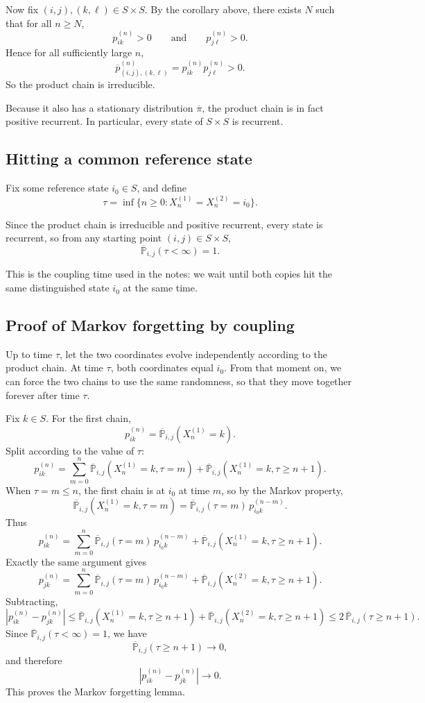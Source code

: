 \documentclass[11pt]{article}
\theoremstyle{definition}
\begin{document}
Now fix \((i,j),(k,\ell)\in S\times S\). By the corollary above, there exists \(N\) such that for all \(n\ge N\),
\[
p_{ik}^{(n)}>0
\qquad\text{and}\qquad
p_{j\ell}^{(n)}>0.
\]
Hence for all sufficiently large \(n\),
\[
\overline p^{(n)}_{(i,j),(k,\ell)}
=
p_{ik}^{(n)}p_{j\ell}^{(n)}
>0.
\]
So the product chain is irreducible.

Because it also has a stationary distribution \(\overline\pi\), the product chain is in fact positive recurrent. In particular, every state of \(S\times S\) is recurrent.

\subsection{Hitting a common reference state}

Fix some reference state \(i_0\in S\), and define
\[
\tau=
\inf\{n\ge 0 : X_n^{(1)}=X_n^{(2)}=i_0\}.
\]

Since the product chain is irreducible and positive recurrent, every state is recurrent, so from any starting point \((i,j)\in S\times S\),
\[
\overline{\mathbb P}_{i,j}(\tau<\infty)=1.
\]

This is the coupling time used in the notes: we wait until both copies hit the same distinguished state \(i_0\) at the same time.

\subsection{Proof of Markov forgetting by coupling}

Up to time \(\tau\), let the two coordinates evolve independently according to the product chain. At time \(\tau\), both coordinates equal \(i_0\). From that moment on, we can force the two chains to use the same randomness, so that they move together forever after time \(\tau\).

Fix \(k\in S\). For the first chain,
\[
p_{ik}^{(n)}
=
\overline{\mathbb P}_{i,j}(X_n^{(1)}=k).
\]
Split according to the value of \(\tau\):
\[
p_{ik}^{(n)}
=
\sum_{m=0}^{n}
\overline{\mathbb P}_{i,j}(X_n^{(1)}=k,\tau=m)
+
\overline{\mathbb P}_{i,j}(X_n^{(1)}=k,\tau\ge n+1).
\]
When \(\tau=m\le n\), the first chain is at \(i_0\) at time \(m\), so by the Markov property,
\[
\overline{\mathbb P}_{i,j}(X_n^{(1)}=k,\tau=m)
=
\overline{\mathbb P}_{i,j}(\tau=m)
\,p_{i_0k}^{(n-m)}.
\]
Thus
\[
p_{ik}^{(n)}
=
\sum_{m=0}^{n}
\overline{\mathbb P}_{i,j}(\tau=m)
\,p_{i_0k}^{(n-m)}
+
\overline{\mathbb P}_{i,j}(X_n^{(1)}=k,\tau\ge n+1).
\]
Exactly the same argument gives
\[
p_{jk}^{(n)}
=
\sum_{m=0}^{n}
\overline{\mathbb P}_{i,j}(\tau=m)
\,p_{i_0k}^{(n-m)}
+
\overline{\mathbb P}_{i,j}(X_n^{(2)}=k,\tau\ge n+1).
\]
Subtracting,
\[
\left|p_{ik}^{(n)}-p_{jk}^{(n)}\right|
\le
\overline{\mathbb P}_{i,j}(X_n^{(1)}=k,\tau\ge n+1)
+
\overline{\mathbb P}_{i,j}(X_n^{(2)}=k,\tau\ge n+1)
\le
2\,\overline{\mathbb P}_{i,j}(\tau\ge n+1).
\]
Since \(\overline{\mathbb P}_{i,j}(\tau<\infty)=1\), we have
\[
\overline{\mathbb P}_{i,j}(\tau\ge n+1)\to 0,
\]
and therefore
\[
\left|p_{ik}^{(n)}-p_{jk}^{(n)}\right|\to 0.
\]
This proves the Markov forgetting lemma.
\end{document}
